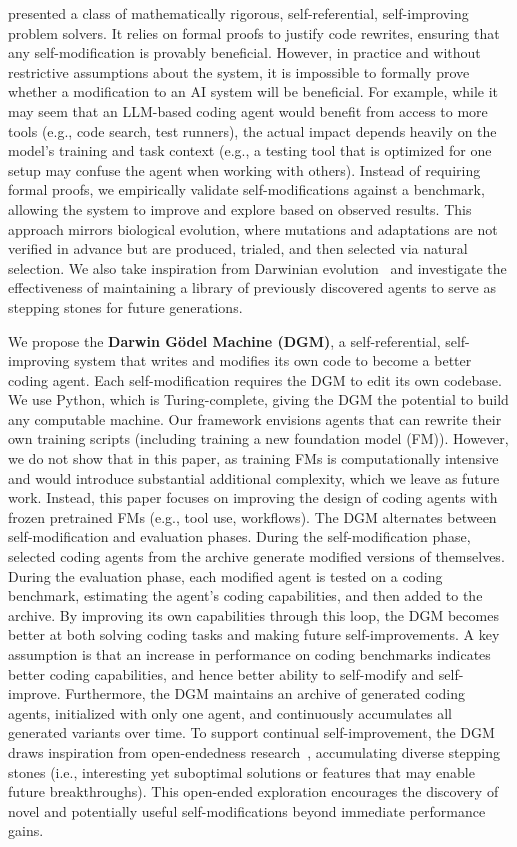 \documentclass{article}
\begin{document}
\citet{schmidhuber2007godel} presented a class of mathematically rigorous, self-referential, self-improving problem solvers. It relies on formal proofs to justify code rewrites, ensuring that any self-modification is provably beneficial. However, in practice and without restrictive assumptions about the system, it is impossible to formally prove whether a modification to an AI system will be beneficial. For example, while it may seem that an LLM-based coding agent would benefit from access to more tools (e.g., code search, test runners), the actual impact depends heavily on the model’s training and task context (e.g., a testing tool that is optimized for one setup may confuse the agent when working with others). Instead of requiring formal proofs, we empirically validate self-modifications against a benchmark, allowing the system to improve and explore based on observed results. This approach mirrors biological evolution, where mutations and adaptations are not verified in advance but are produced, trialed, and then selected via natural selection. We also take inspiration from Darwinian evolution~\citep{darwin2023origin} and investigate the effectiveness of maintaining a library of previously discovered agents to serve as stepping stones for future generations.

We propose the \textbf{Darwin G\"odel Machine (DGM)}, a self-referential, self-improving system that writes and modifies its own code to become a better coding agent. Each self-modification requires the DGM to edit its own codebase. We use Python, which is Turing-complete, giving the DGM the potential to build any computable machine. Our framework envisions agents that can rewrite their own training scripts (including training a new foundation model (FM)). However, we do not show that in this paper, as training FMs is computationally intensive and would introduce substantial additional complexity, which we leave as future work. Instead, this paper focuses on improving the design of coding agents with frozen pretrained FMs (e.g., tool use, workflows). The DGM alternates between self-modification and evaluation phases. During the self-modification phase, selected coding agents from the archive generate modified versions of themselves. During the evaluation phase, each modified agent is tested on a coding benchmark, estimating the agent's coding capabilities, and then added to the archive. By improving its own capabilities through this loop, the DGM becomes better at both solving coding tasks and making future self-improvements. A key assumption is that an increase in performance on coding benchmarks indicates better coding capabilities, and hence better ability to self-modify and self-improve. Furthermore, the DGM maintains an archive of generated coding agents, initialized with only one agent, and continuously accumulates all generated variants over time. To support continual self-improvement, the DGM draws inspiration from open-endedness research~\citep{wang2019paired, fernandopromptbreeder, faldor2025omni}, accumulating diverse stepping stones (i.e., interesting yet suboptimal solutions or features that may enable future breakthroughs). This open-ended exploration encourages the discovery of novel and potentially useful self-modifications beyond immediate performance gains.
\end{document}
